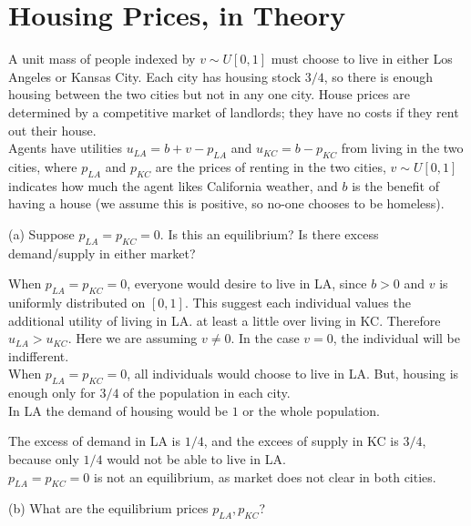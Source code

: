 \section{Housing Prices, in Theory}

A unit mass of people indexed by \( v \sim U[0,1] \) must choose to live in either Los Angeles or Kansas City. Each city has housing stock \( 3/4 \), so there is enough housing between the two cities but not in any one city. House prices are determined by a competitive market of landlords; they have no costs if they rent out their house.\\

Agents have utilities \( u_{LA} = b + v - p_{LA} \) and \( u_{KC} = b - p_{KC} \) from living in the two cities, where \( p_{LA} \) and \( p_{KC} \) are the prices of renting in the two cities, \( v \sim U[0,1] \) indicates how much the agent likes California weather, and \( b \) is the benefit of having a house (we assume this is positive, so no-one chooses to be homeless).



\begin{tcolorbox}
    (a) Suppose \( p_{LA} = p_{KC} = 0 \). Is this an equilibrium? Is there excess demand/supply in either market?
\end{tcolorbox}

When \( p_{LA} = p_{KC} = 0 \), everyone would desire to live in LA, since $b>0$ and $v$ is uniformly distributed on $[0,1]$. This suggest each individual values the additional utility of living in LA. at least a little over living in KC. Therefore $u_{LA}>u_{KC}$. Here we are assuming $v \neq 0$. In the case $v = 0$, the individual will be indifferent.\\

When $p_{LA} = p_{KC} = 0$, all individuals would choose to live in LA. But, housing is enough only for $3/4$ of the population in each city.\\

In LA the demand of housing would be $1$ or the whole population.

\begin{myanswerbox}
    The excess of demand in LA is $1/4$, and the excees of supply in KC is $3/4$, because only $1/4$ would not be able to live in LA.\\

    $p_{LA} = p_{KC} = 0$ is not an equilibrium, as market does not clear in both cities.
\end{myanswerbox}
\begin{tcolorbox}
    (b) What are the equilibrium prices \( p_{LA}, p_{KC} \)?
\end{tcolorbox}

